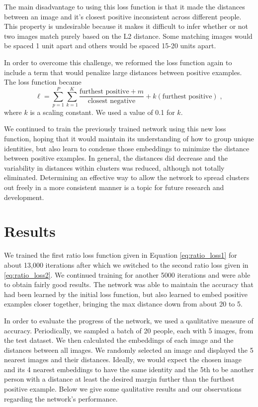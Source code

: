 The main disadvantage to using this loss function is that it made the distances between an image and it's closest positive inconsistent across different people. This property is undesirable because it makes it difficult to infer whether or not two images match purely based on the L2 distance. Some matching images would be spaced 1 unit apart and others would be spaced 15-20 units apart.

In order to overcome this challenge, we reformed the loss function again to include a term that would penalize large distances between positive examples. The loss function became
\begin{equation}
\label{eq:ratio_loss2}
    \ell = \sum_{p=1}^P \sum_{k=1}^K
            \frac{\text{furthest positive} + m}{\text{closest negative}} + k(\text{furthest positive})\;,
\end{equation}
where $k$ is a scaling constant. We used a value of 0.1 for $k$.

We continued to train the previously trained network using this new loss function, hoping that it would maintain its understanding of how to group unique identities, but also learn to condense those embeddings to minimize the distance between positive examples. In general, the distances did decrease and the variability in distances within clusters was reduced, although not totally eliminated. Determining an effective way to allow the network to spread clusters out freely in a more consistent manner is a topic for future research and development.


\section{Results}

We trained the first ratio loss function given in Equation \eqref{eq:ratio_loss1} for about 13,000 iterations after which we switched to the second ratio loss given in \eqref{eq:ratio_loss2}. We continued training for another 5000 iterations and were able to obtain fairly good results. The network was able to maintain the accuracy that had been learned by the initial loss function, but also learned to embed positive examples closer together, bringing the max distance down from about 20 to 5.

In order to evaluate the progress of the network, we used a qaulitative measure of accuracy. Periodically, we sampled a batch of 20 people, each with 5 images, from the test dataset. We then calculated the embeddings of each image and the distances between all images. We randomly selected an image and displayed the 5 nearest images and their distances. Ideally, we would expect the chosen image and its 4 nearest embeddings to have the same identity and the 5th to be another person with a distance at least the desired margin further than the furthest positive example. Below we give some qaulitative results and our observations regarding the network's performance.

